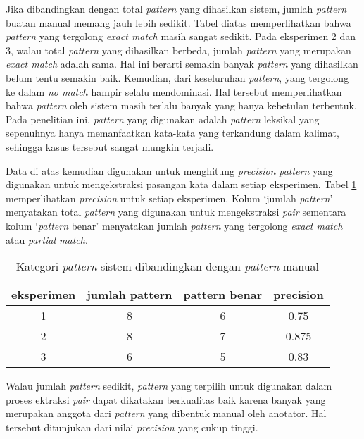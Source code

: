 Jika dibandingkan dengan total \textit{pattern} yang dihasilkan sistem, jumlah \textit{pattern} buatan manual memang jauh lebih sedikit. Tabel diatas memperlihatkan bahwa \textit{pattern} yang tergolong \textit{exact match} masih sangat sedikit. Pada eksperimen 2 dan 3, walau total \textit{pattern} yang dihasilkan berbeda, jumlah \textit{pattern} yang merupakan \textit{exact match} adalah sama. Hal ini berarti semakin banyak \textit{pattern} yang dihasilkan belum tentu semakin baik. Kemudian, dari keseluruhan \textit{pattern}, yang tergolong ke dalam \textit{no match} hampir selalu mendominasi. Hal tersebut memperlihatkan bahwa  \textit{pattern} oleh sistem masih terlalu banyak yang hanya kebetulan terbentuk. Pada penelitian ini, \textit{pattern} yang digunakan adalah \textit{pattern} leksikal yang sepenuhnya hanya memanfaatkan kata-kata yang terkandung dalam kalimat, sehingga kasus tersebut sangat mungkin terjadi.

Data di atas kemudian digunakan untuk menghitung \textit{precision} \textit{pattern} yang digunakan untuk mengekstraksi pasangan kata dalam setiap eksperimen. Tabel \ref{table:preceks} memperlihatkan \textit{precision} untuk setiap eksperimen. Kolum `jumlah \textit{pattern}' menyatakan total \textit{pattern} yang digunakan untuk mengekstraksi \textit{pair} sementara kolum `\textit{pattern} benar' menyatakan jumlah \textit{pattern} yang tergolong \textit{exact match} atau \textit{partial match}. 

\begin{table}
  \centering
  \caption{Kategori \textit{pattern} sistem dibandingkan dengan \textit{pattern} manual}
  \label{table:preceks}
  \begin{tabular}{|c|c|c|c|} 
  \hline
  eksperimen & jumlah pattern & pattern benar & precision \\ \hline
  1 & 8 & 6 & 0.75 \\ \hline
  2 & 8 & 7 & 0.875 \\ \hline
  3 & 6 & 5 & 0.83 \\ \hline
  \end{tabular} 
\end{table}

Walau jumlah \textit{pattern} sedikit, \textit{pattern} yang terpilih untuk digunakan dalam proses ektraksi \textit{pair} dapat dikatakan berkualitas baik karena banyak yang merupakan anggota dari \textit{pattern} yang dibentuk manual oleh anotator. Hal tersebut ditunjukan dari nilai \textit{precision} yang cukup tinggi.

